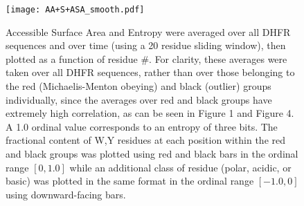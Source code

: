 \documentclass[a4paper,11pt]{article}
\begin{document}
\begin{figure}[a]
\centerline{\texttt{[image: AA+S+ASA\_smooth.pdf]}}
\caption[Moving-Average $S_{\rm all}$, Moving-Average $ASA_{\rm all}$, WY/Polar/Acidic/Basic Content vs Residue \#]{Accessible Surface Area and Entropy were averaged over all DHFR sequences and over time (using a 20 residue sliding window), then plotted as a function of residue \#. For clarity, these averages were taken over all DHFR sequences, rather than over those belonging to the red (Michaelis-Menton obeying) and black (outlier) groups individually, since the averages over red and black groups have extremely high correlation, as can be seen in Figure 1 and Figure 4. A 1.0 ordinal value corresponds to an entropy of three bits. The fractional content of W,Y residues at each position within the red and black groups was plotted using red and black bars in the ordinal range $[0,1.0]$ while an additional class of residue (polar, acidic, or basic) was plotted in the same format in the ordinal range $[-1.0,0]$ using downward-facing bars.}
\end{figure}
\end{document}
